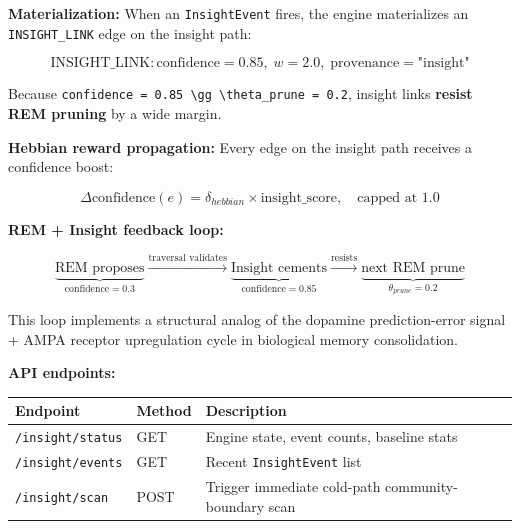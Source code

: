 \documentclass[10pt,journal,compsoc]{IEEEtran}
\begin{document}
\textbf{Materi\-alization:} When an \texttt{InsightEvent} fires, the engine mater\-ializes an \texttt{INSIGHT\_LINK} edge on the insight path:

\begin{equation}
\text{INSIGHT\_LINK}: \text{confidence} = 0.85,\; w = 2.0,\; \text{provenance} = \text{"insight"}
\end{equation}

Because \texttt{confidence = 0.85 \textbackslash gg \textbackslash theta\_{prune} = 0.2}, insight links \textbf{resist REM pruning} by a wide margin.

\textbf{Hebbian reward propagation:} Every edge on the insight path receives a confidence boost:

\begin{equation}
\Delta\text{confidence}(e) = \delta_{hebbian} \times \text{insight\_score}, \quad \text{capped at } 1.0
\end{equation}

\textbf{REM + Insight feedback loop:}

\begin{equation}
\underbrace{\text{REM proposes}}_{\text{confidence} = 0.3} \xrightarrow{\text{traversal validates}} \underbrace{\text{Insight cements}}_{\text{confidence} = 0.85} \xrightarrow{\text{resists}} \underbrace{\text{next REM prune}}_{\theta_{prune} = 0.2}
\end{equation}

This loop implements a structural analog of the dopamine prediction-error signal + AMPA receptor upreg\-ulation cycle in biological memory conso\-lidation.

\textbf{API endpoints:}

\begin{center}
{\footnotesize
\begin{tabularx}{\columnwidth}{|>{\raggedright\arraybackslash}X|>{\raggedright\arraybackslash}X|>{\raggedright\arraybackslash}X|}
\hline
Endpoint & Method & Description \\ \hline
\texttt{/insight/status} & GET & Engine state, event counts, baseline stats \\ \hline
\texttt{/insight/events} & GET & Recent \texttt{InsightEvent} list \\ \hline
\texttt{/insight/scan} & POST & Trigger immediate cold-path community-boundary scan \\ \hline
\end{tabularx}
}
\end{center}
\end{document}
